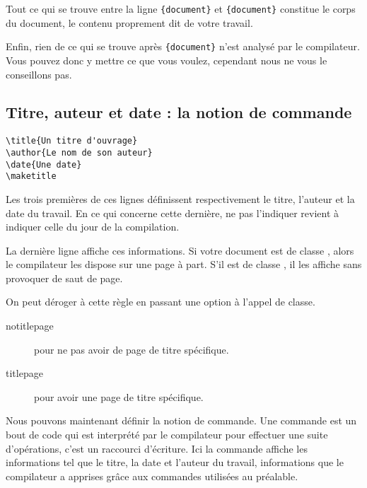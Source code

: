 Tout ce qui se trouve entre la ligne \verb|{document}| et \verb|{document}| constitue le corps du document, le contenu proprement dit de votre travail.

Enfin, rien de ce qui se trouve après \verb|{document}| n'est analysé par le compilateur. Vous pouvez donc y mettre ce que vous voulez, cependant nous ne vous le conseillons pas.

\subsection{Titre, auteur et date : la notion de commande}\label{notioncommande}

\begin{verbatim}
\title{Un titre d'ouvrage}
\author{Le nom de son auteur}
\date{Une date}
\maketitle
\end{verbatim}

Les trois premières de ces lignes définissent respectivement le titre, l'auteur et la date du travail. En ce qui concerne cette dernière, ne pas l'indiquer revient à indiquer  celle du jour de la compilation.

La dernière ligne affiche ces informations. Si votre document est de classe  , alors le compilateur les dispose sur une page à part. S'il est de classe  , il les affiche sans provoquer de saut de page.

On peut déroger à cette règle en passant une option à l'appel de classe.
\begin{description}
\item[notitlepage] pour ne pas avoir de page de titre spécifique.
\item[titlepage] pour avoir une page de titre spécifique.
\end{description}

Nous pouvons maintenant définir la notion de commande. Une commande  est un bout de code qui est interprété par le compilateur pour effectuer une suite d'opérations, c'est un raccourci d'écriture. 
Ici la commande  affiche les informations tel que le titre, la date et l'auteur du travail, informations que le compilateur a apprises grâce aux commandes utilisées au préalable.

